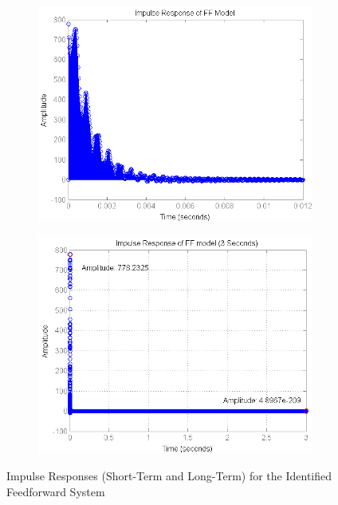 \begin{figure}[h]
\centering
\begin{subfigure}[b]{0.5\textwidth}
\includegraphics[width=1.0\textwidth]{pics/impulse_FF}
\caption{}
\label{fig:impulse_FF}
\end{subfigure}\;\begin{subfigure}[b]{0.5\textwidth}
\includegraphics[width=1.0\textwidth]{pics/impulse_FF_3sec}
\caption{}
\label{fig:impulse_FF_3sec}
\end{subfigure}
\caption{Impulse Responses (Short-Term and Long-Term) for the Identified Feedforward System}

\end{figure}

